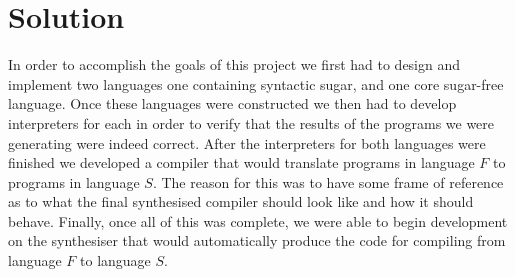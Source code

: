 \documentclass[twoside]{article}
\begin{document}
\section{Solution}
In order to accomplish the goals of this project we first had to
design and implement two languages one containing syntactic sugar, and
one core sugar-free language. Once these languages were constructed we
then had to develop interpreters for each in order to verify that the
results of the programs we were generating were indeed correct. After
the interpreters for both languages were finished we developed a
compiler that would translate programs in language $F$ to programs in
language
$S$. The reason for this was to have some frame of reference as to
what the final synthesised compiler should look like and how it should
behave. Finally, once all of this was complete, we were able to begin
development on the synthesiser that would automatically produce the
code for compiling from language $F$ to language $S$.
\end{document}
